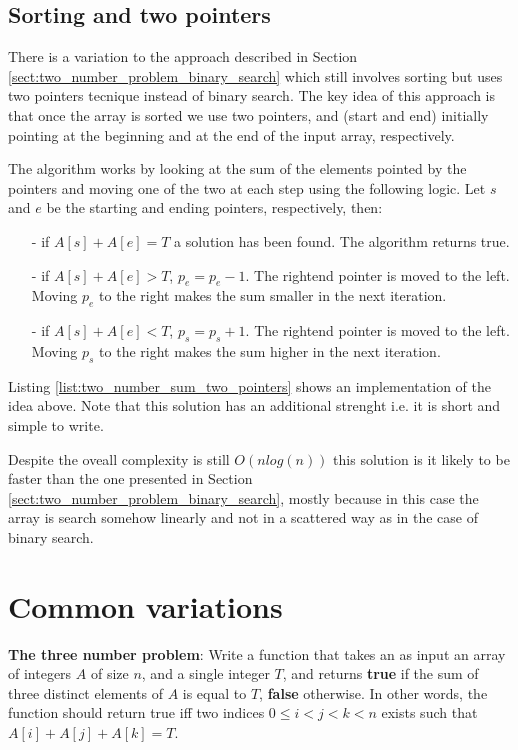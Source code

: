 \subsection{Sorting and two pointers}
\label{sec:two_numbers:twopointers}
There is a variation to the approach described in Section
\ref{sect:two_number_problem_binary_search} which still involves sorting but uses two pointers
tecnique instead of binary search. The key idea of this approach is that once the array is sorted
we use two pointers,  and  (start and end) initially pointing  at the beginning and at the end of the input array, respectively.

The algorithm works by looking at the sum of the elements pointed by the pointers and moving one of
the two at each step using the following logic. Let $s$ and $e$ be the starting and ending
pointers, respectively, then:
\begin{itemize}
	\item[-] if $A[s]+A[e] = T$ a solution has been found. The algorithm returns true.
	\item[-] if $A[s]+A[e] > T$, $p_e=p_e-1$. The rightend pointer is moved to the left. Moving
	$p_e$ to the right makes the sum smaller in the next iteration. 
	\item[-] if $A[s]+A[e] < T$, $p_s=p_s+1$. The rightend pointer is moved to the left. Moving
	$p_s$ to the right makes the sum higher in the next iteration. 
\end{itemize}

Listing \ref{list:two_number_sum_two_pointers} shows an implementation of the idea above.  Note that
this solution has an additional strenght i.e.  it is short and simple to write. 

\begin{minipage}{\linewidth}
	
\end{minipage}

Despite the oveall complexity is still $O(n log(n))$ this solution is it likely to be faster than
the one presented in Section \ref{sect:two_number_problem_binary_search}, mostly because in this
case the array is search somehow linearly and not in a scattered way as in the case of binary
search.

\section{Common variations}
\begin{exercise}
	\textbf{The three number problem}: Write a function that takes an as input an array of integers $A$ of size $n$, and a single integer $T$, and
	returns \textbf{true} if the sum of three distinct elements of $A$ is equal to $T$, \textbf{false}
	otherwise. In other words, the function should return true iff two indices $ 0 \leq i < j  < k < n$ exists such that $A[i]+A[j]+A[k] = T$.
\end{exercise}	

